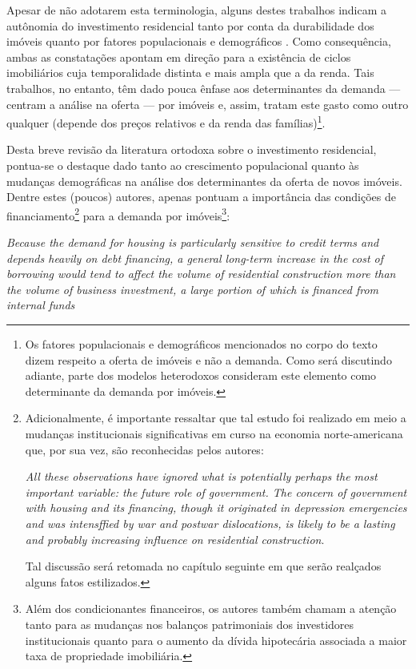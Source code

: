 Apesar de não adotarem esta terminologia, alguns destes trabalhos indicam a autônomia do investimento residencial tanto por conta da durabilidade dos imóveis \cite{derksen_long_1940} quanto por fatores populacionais e demográficos \cites{hansen_economic_1939}{grebler_capital_1956}. Como consequência, ambas as constatações apontam em direção para a existência de ciclos imobiliários cuja temporalidade distinta e mais ampla que a da renda. 
Tais trabalhos, no entanto, têm dado pouca ênfase aos determinantes da demanda --- centram a análise na oferta --- por imóveis e, assim,  tratam este gasto como outro qualquer (depende dos preços relativos e da renda das famílias)\footnote{Os fatores populacionais e demográficos mencionados no corpo do texto dizem respeito a oferta de imóveis e não a demanda. Como será discutindo adiante, parte dos modelos heterodoxos consideram este elemento como determinante da demanda por imóveis.}.

Desta breve revisão da literatura ortodoxa sobre o investimento residencial, pontua-se o destaque dado tanto ao crescimento populacional quanto às mudanças demográficas na análise dos determinantes da oferta de novos imóveis.
Dentre estes (poucos) autores, apenas \textcite{grebler_capital_1956} pontuam a importância das condições de financiamento\footnote{
	Adicionalmente, é importante ressaltar que tal estudo foi realizado em meio a mudanças institucionais significativas em curso na economia norte-americana que, por sua vez, são reconhecidas pelos autores:
	\begin{citacao}
		\textit{All these observations have ignored what is potentially perhaps the most important variable: the future role of government. The concern
			of government with housing and its financing, though it originated in
			depression emergencies and was intensffied by war and postwar dislocations, is likely to be a lasting and probably increasing influence on
			residential construction}.
		\cite[p.~27]{grebler_capital_1956}
	\end{citacao}
	Tal discussão será retomada no capítulo seguinte em que serão realçados alguns fatos estilizados.
} para a demanda por imóveis\footnote{Além dos condicionantes financeiros, os autores também chamam a atenção tanto para as mudanças nos balanços patrimoniais dos investidores institucionais quanto para o aumento da dívida hipotecária associada a maior taxa de propriedade imobiliária.
}:
	\begin{citacao}
		\textit{Because the demand for housing is particularly sensitive to credit
		terms and depends heavily on debt financing, a general long-term increase
		in the cost of borrowing would tend to affect the volume of
		residential construction more than the volume of business investment,
		a large portion of which is financed from internal funds}
		\cite[p.~322--3]{grebler_capital_1956}
	\end{citacao}

